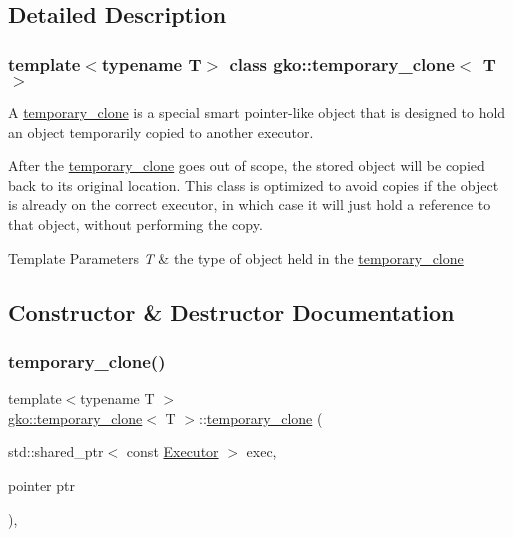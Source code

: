 \subsection{Detailed Description}
\subsubsection*{template$<$typename T$>$\newline
class gko\+::temporary\+\_\+clone$<$ T $>$}

A \hyperlink{classgko_1_1temporary__clone}{temporary\+\_\+clone} is a special smart pointer-\/like object that is designed to hold an object temporarily copied to another executor. 

After the \hyperlink{classgko_1_1temporary__clone}{temporary\+\_\+clone} goes out of scope, the stored object will be copied back to its original location. This class is optimized to avoid copies if the object is already on the correct executor, in which case it will just hold a reference to that object, without performing the copy.


\begin{DoxyTemplParams}{Template Parameters}
{\em T} & the type of object held in the \hyperlink{classgko_1_1temporary__clone}{temporary\+\_\+clone} \\
\hline
\end{DoxyTemplParams}


\subsection{Constructor \& Destructor Documentation}
\mbox{\label{classgko_1_1temporary__clone_a73b2e7db31555df95b827625f85da4be}} 
\subsubsection{\texorpdfstring{temporary\+\_\+clone()}{temporary\_clone()}}
{\footnotesize\ttfamily template$<$typename T $>$ \\
\hyperlink{classgko_1_1temporary__clone}{gko\+::temporary\+\_\+clone}$<$ T $>$\+::\hyperlink{classgko_1_1temporary__clone}{temporary\+\_\+clone} (\begin{DoxyParamCaption}\item[{std\+::shared\+\_\+ptr$<$ const \hyperlink{classgko_1_1Executor}{Executor} $>$}]{exec,  }\item[{pointer}]{ptr }\end{DoxyParamCaption})\hspace{0.3cm}{\ttfamily [inline]}, {\ttfamily [explicit]}}



